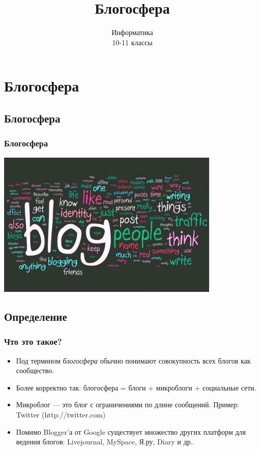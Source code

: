 \documentclass[compress,red]{beamer}
\title{Блогосфера}
\author{Информатика \\ 10-11 классы}
\begin{document}
\maketitle

\section{Блогосфера}

\subsection{Блогосфера}
\begin{frame}
  \frametitle{Блогосфера}
	\centerline{\includegraphics[width=0.8\textwidth]{images/blogosphere.png}}
\end{frame}

\subsection{Определение}
\begin{frame}[fragile]
\frametitle{Что это такое?}
		\begin{itemize}
		\item Под термином \emph{блогосфера} обычно понимают совокупность всех блогов как сообщество.
		\item Более корректно так: блогосфера = блоги + микроблоги + социальные сети.
		\item Микроблог --- это блог с ограничениями по длине сообщений. Пример: Twitter (http://twitter.com)
		\item Помимо Blogger'а от Google существует множество других платформ для ведения блогов: Livejournal, MySpace, Я.ру, Diary и др..
		\end{itemize}
\end{frame}
\end{document}
